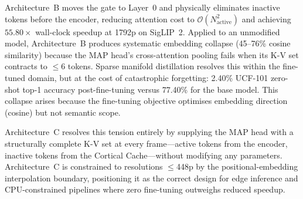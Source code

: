 \documentclass{article}
\begin{document}
Architecture~B moves the gate to Layer~0 and physically eliminates
inactive tokens before the encoder, reducing attention cost to
$\mathcal{O}(N_{\text{active}}^2)$ and achieving $\mathbf{55.80\times}$
wall-clock speedup at 1792p on SigLIP~2. Applied to an unmodified model,
Architecture~B produces systematic embedding collapse (45--76\% cosine
similarity) because the MAP head's cross-attention pooling fails when
its K-V set contracts to $\leq$6 tokens. Sparse manifold distillation
resolves this within the fine-tuned domain, but at the cost of
catastrophic forgetting: 2.40\% UCF-101 zero-shot top-1 accuracy
post-fine-tuning versus 77.40\% for the base model. This collapse arises
because the fine-tuning objective optimises embedding direction (cosine)
but not semantic scope.

Architecture~C resolves this tension entirely by supplying the MAP head
with a structurally complete K-V set at every frame---active tokens from
the encoder, inactive tokens from the Cortical Cache---without modifying
any parameters. Architecture~C is constrained to resolutions $\leq$448p
by the positional-embedding interpolation boundary, positioning it as
the correct design for edge inference and CPU-constrained pipelines where
zero fine-tuning outweighs reduced speedup.
\end{document}
